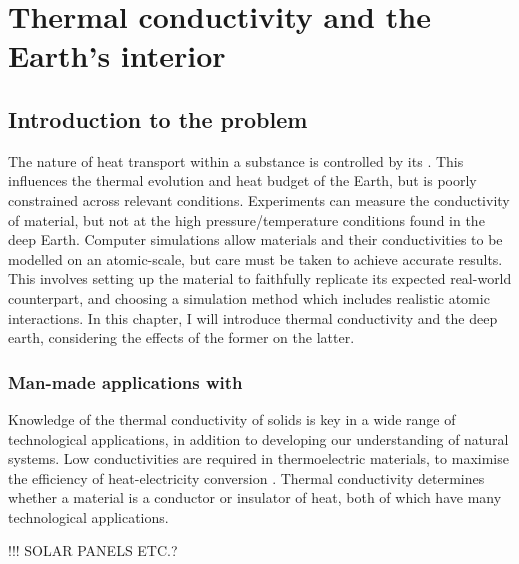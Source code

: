 \chapter{Thermal conductivity and the Earth's interior} %

\label{Chapter1} %


\section{Introduction to the problem}

The nature of heat transport within a substance is controlled by its \tc. This influences the thermal evolution and heat budget of the Earth, but is poorly constrained across relevant conditions. Experiments can measure the conductivity of material, but not at the high pressure/temperature conditions found in the deep Earth. Computer simulations allow materials and their conductivities to be modelled on an atomic-scale, but care must be taken to achieve accurate results. This involves setting up the material to faithfully replicate its expected real-world counterpart, and choosing a simulation method which includes realistic atomic interactions. In this chapter, I will introduce thermal conductivity and the deep earth, considering the effects of the former on the latter.


\subsection{Man-made applications with \tc}
Knowledge of the thermal conductivity of solids is key in a wide range of technological applications, in addition to developing our understanding of natural systems. Low conductivities are required in thermoelectric materials, to maximise the efficiency of heat-electricity conversion \citep{Snyder2008}. Thermal conductivity determines whether a material is a conductor or insulator of heat, both of which have many technological applications.

!!! SOLAR PANELS ETC.?

